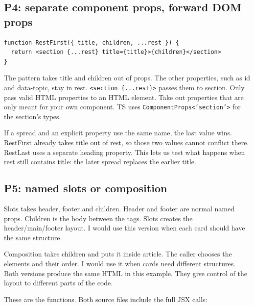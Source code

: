 \documentclass[
  10pt,
  a4paper,
]{article}
\begin{document}
\subsection{P4: separate component props, forward DOM
props}\label{p4-separate-component-props-forward-dom-props}

\begin{minipage}{\linewidth}

\begin{lstlisting}
function RestFirst({ title, children, ...rest }) {
  return <section {...rest} title={title}>{children}</section>
}
\end{lstlisting}

\end{minipage}\par

The pattern takes title and children out of props. The other properties,
such as id and data-topic, stay in rest.
\texttt{<section \{.\allowbreak{}.\allowbreak{}.\allowbreak{}rest\}>}
passes them to section. Only pass valid HTML properties to an HTML
element. Take out properties that are only meant for your own component.
TS uses \texttt{ComponentProps<'section'>} for the section's types.

If a spread and an explicit property use the same name, the last value
wins. RestFirst already takes title out of rest, so those two values
cannot conflict there. RestLast uses a separate heading property. This
lets us test what happens when rest still contains title: the later
spread replaces the earlier title.

\subsection{P5: named slots or
composition}\label{p5-named-slots-or-composition}

Slots takes header, footer and children. Header and footer are normal
named props. Children is the body between the tags. Slots creates the
header/main/footer layout. I would use this version when each card
should have the same structure.

Composition takes children and puts it inside article. The caller
chooses the elements and their order. I would use it when cards need
different structures. Both versions produce the same HTML in this
example. They give control of the layout to different parts of the code.

These are the functions. Both source files include the full JSX calls:
\end{document}
